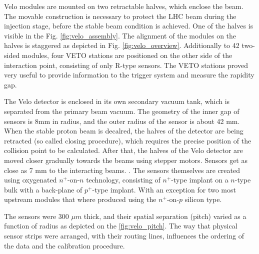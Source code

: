 Velo modules are mounted on two retractable halves, which enclose the beam. The movable construction is necessary to protect the LHC beam during the injection stage, before the stable beam condition is achieved.
One of the halves is visible in the Fig. \ref{fig:velo_assembly}.
The alignment of the modules on the halves is staggered as depicted in Fig. \ref{fig:velo_overview}.
Additionally to 42 two-sided modules, four VETO stations are positioned on the other side of the interaction point, consisting of only R-type sensors. The VETO stations proved very useful to provide information to the trigger system and measure the rapidity gap.

The Velo detector is enclosed in its own secondary vacuum tank, which is separated from the primary beam vacuum.
The geometry of the inner gap of sensors is 8mm in radius, and the outer radius of the sensor is about 42 mm.
When the stable proton beam is decalred, the halves of the detector are being retracted (so called closing procedure), which requires the precise position of the collision point to be calculated.
After that, the halves of the Velo detector are moved closer gradually towards the beams using stepper
motors. Sensors get as close as 7 mm to the interacting beams. \cite{Aaij:1707015}.
The sensors themselves are created using oxygenated $n^{+}$-on-$n$ technology, consisting of $n^{+}$-type implant on a $n$-type bulk with a back-plane of $p^{+}$-type implant.
With an exception for two most upstream modules that where produced using the $n^{+}$-on-$p$ silicon type.

The sensors were 300 $\mu m$ thick, and their spatial separation (pitch) varied as a function of radius \cite{Barbosa-Marinho:504321} as depicted on the \ref{fig:velo_pitch}. The way that physical sensor strips were arranged, with their routing lines, influences the ordering of the data and the calibration procedure.

